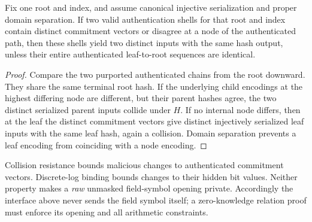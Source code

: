 \begin{lemma}\label{lem:full:merkle-binding}
Fix one root and index, and assume canonical
injective serialization and proper domain
separation. If two valid authentication shells
for that root and index contain distinct
commitment vectors or disagree at a node
of the authenticated path, then these shells
yield two distinct inputs with the same hash
output, unless their entire authenticated
leaf-to-root sequences are identical.
\end{lemma}
\begin{proof}
Compare the two purported authenticated
chains from the root downward.
They share the same terminal root hash.
If the underlying child encodings at the
highest differing node are different,
but their parent hashes agree, the two
distinct serialized parent inputs collide
under $H$. If no internal node differs,
then at the leaf the distinct commitment
vectors give distinct injectively serialized
leaf inputs with the same leaf hash,
again a collision. Domain separation
prevents a leaf encoding from coinciding
with a node encoding.
\end{proof}

\begin{remark}
Collision resistance bounds malicious
changes to authenticated commitment vectors.
Discrete-log binding bounds changes to
their hidden bit values.
Neither property makes a \emph{raw}
unmasked field-symbol opening private.
Accordingly the interface above never sends
the field symbol itself; a zero-knowledge
relation proof must enforce its opening
and all arithmetic constraints.
\end{remark}
